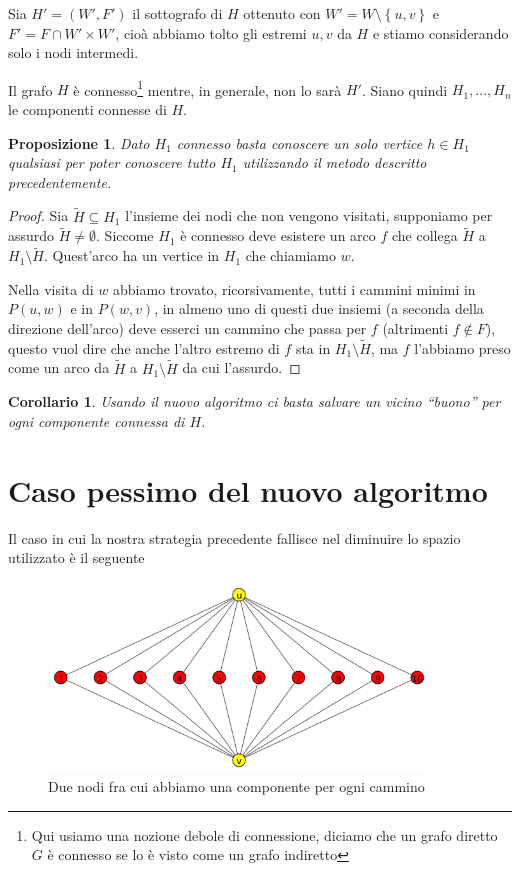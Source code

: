 \documentclass[a4paper,10pt]{amsbook}
\newcounter{counter1}
\theoremstyle{plain}
\newtheorem{mypro}[counter1]{Proposizione}
\newtheorem{mycor}[counter1]{Corollario}
\theoremstyle{definition}
\theoremstyle{remark}
\newcommand{\set}[1]{\left\{#1\right\}}
\begin{document}
Sia $H' = (W',F')$ il sottografo di $H$ ottenuto con $W' = W \setminus
\set{u,v}$ e $F' = F \cap W' \times W'$, cio\`a abbiamo tolto gli
estremi $u,v$ da $H$ e stiamo considerando solo i nodi intermedi.

Il grafo $H$ \`e connesso\footnote{Qui usiamo una nozione debole di
  connessione, diciamo che un grafo diretto $G$ \`e connesso se lo \`e
  visto come un grafo indiretto} mentre, in generale, non lo sar\`a
$H'$. Siano quindi $H_1, ..., H_n$ le componenti connesse di $H$.

\begin{mypro}
  Dato $H_1$ connesso basta conoscere un solo vertice $h \in H_1$
  qualsiasi per poter conoscere tutto $H_1$ utilizzando il metodo
  descritto precedentemente.
\end{mypro}
\begin{proof}
  Sia $\tilde H \subseteq H_1$ l'insieme dei nodi che non vengono
  visitati, supponiamo per assurdo $\tilde H \neq \emptyset$. Siccome
  $H_1$ \`e connesso deve esistere un arco $f$ che collega $\tilde H$
  a $H_1 \setminus \tilde H$. Quest'arco ha un vertice in $H_1$ che
  chiamiamo $w$.

  Nella visita di $w$ abbiamo trovato, ricorsivamente, tutti i cammini
  minimi in $P(u,w)$ e in $P(w,v)$, in almeno uno di questi due
  insiemi (a seconda della direzione dell'arco) deve esserci un
  cammino che passa per $f$ (altrimenti $f\not\in F$), questo vuol
  dire che anche l'altro estremo di $f$ sta in $H_1 \setminus \tilde
  H$, ma $f$ l'abbiamo preso come un arco da $\tilde H$ a $H_1
  \setminus \tilde H$ da cui l'assurdo.
\end{proof}
\begin{mycor}
  Usando il nuovo algoritmo ci basta salvare un vicino ``buono'' per
  ogni componente connessa di $H$.
\end{mycor}

\section{Caso pessimo del nuovo algoritmo}
\label{sec:casopessimo}

Il caso in cui la nostra strategia precedente fallisce nel
diminuire lo spazio utilizzato \`e il seguente

\begin{figure}[H]
  \centering
  \includegraphics[width=0.9\textwidth]{diamante}
  \caption{Due nodi fra cui abbiamo una componente per ogni cammino}
  \label{fig:diamante}
\end{figure}
\end{document}

